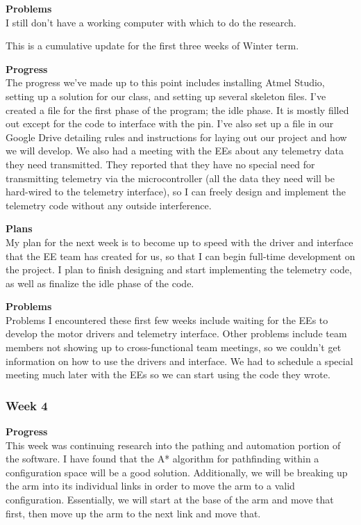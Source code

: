 \textbf{Problems} \\ 
I still don't have a working computer with which to do the research.

This is a cumulative update for the first three weeks of Winter term.

\textbf{Progress} \\
The progress we've made up to this point includes installing Atmel Studio, 
setting up a solution for our class, and setting up several skeleton files. 
I've created a file for the first phase of the program; the idle phase. It is 
mostly filled out except for the code to interface with the pin. I've also set
up a file in our Google Drive detailing rules and instructions for laying out 
our project and how we will develop. We also had a meeting with the EEs about 
any telemetry data they need transmitted. They reported that they have no 
special need for transmitting telemetry via the microcontroller (all the data 
they need will be hard-wired to the telemetry interface), so I can freely 
design and implement the telemetry code without any outside interference.

\textbf{Plans} \\
My plan for the next week is to become up to speed with the driver and 
interface that the EE team has created for us, so that I can begin full-time 
development on the project. I plan to finish designing and start implementing 
the telemetry code, as well as finalize the idle phase of the code.

\textbf{Problems} \\
Problems I encountered these first few weeks include waiting for the EEs to 
develop the motor drivers and telemetry interface. Other problems include team
members not showing up to cross-functional team meetings, so we couldn't get 
information on how to use the drivers and interface. We had to schedule a 
special meeting much later with the EEs so we can start using the code they 
wrote.

\subsubsection{Week 4}
\textbf{Progress} \\ 
This week was continuing research into the pathing and automation portion of the software. I have found that the A* algorithm for pathfinding within a configuration space will be a good solution. Additionally, we will be breaking up the arm into its individual links in order to move the arm to a valid configuration. Essentially, we will start at the base of the arm and move that first, then move up the arm to the next link and move that.

